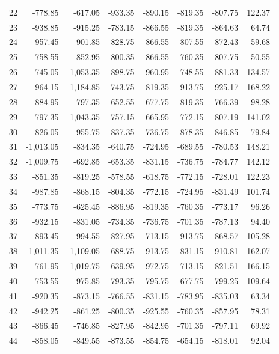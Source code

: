 \begin{longtable}{rrrrrrrr}
22 & -778.85 & -617.05 & -933.35 & -890.15 & -819.35 & -807.75 & 122.37  \\
23 & -938.85 & -915.25 & -783.15 & -866.55 & -819.35 & -864.63 & 64.74  \\
24 & -957.45 & -901.85 & -828.75 & -866.55 & -807.55 & -872.43 & 59.68  \\
25 & -758.55 & -852.95 & -800.35 & -866.55 & -760.35 & -807.75 & 50.55  \\
26 & -745.05 & -1,053.35 & -898.75 & -960.95 & -748.55 & -881.33 & 134.57  \\
27 & -964.15 & -1,184.85 & -743.75 & -819.35 & -913.75 & -925.17 & 168.22  \\
28 & -884.95 & -797.35 & -652.55 & -677.75 & -819.35 & -766.39 & 98.28  \\
29 & -797.35 & -1,043.35 & -757.15 & -665.95 & -772.15 & -807.19 & 141.02  \\
30 & -826.05 & -955.75 & -837.35 & -736.75 & -878.35 & -846.85 & 79.84  \\
31 & -1,013.05 & -834.35 & -640.75 & -724.95 & -689.55 & -780.53 & 148.21  \\
32 & -1,009.75 & -692.85 & -653.35 & -831.15 & -736.75 & -784.77 & 142.12  \\
33 & -851.35 & -819.25 & -578.55 & -618.75 & -772.15 & -728.01 & 122.23  \\
34 & -987.85 & -868.15 & -804.35 & -772.15 & -724.95 & -831.49 & 101.74  \\
35 & -773.75 & -625.45 & -886.95 & -819.35 & -760.35 & -773.17 & 96.26  \\
36 & -932.15 & -831.05 & -734.35 & -736.75 & -701.35 & -787.13 & 94.40  \\
37 & -893.45 & -994.55 & -827.95 & -713.15 & -913.75 & -868.57 & 105.28  \\
38 & -1,011.35 & -1,109.05 & -688.75 & -913.75 & -831.15 & -910.81 & 162.07  \\
39 & -761.95 & -1,019.75 & -639.95 & -972.75 & -713.15 & -821.51 & 166.15  \\
40 & -753.55 & -975.85 & -793.35 & -795.75 & -677.75 & -799.25 & 109.64  \\
41 & -920.35 & -873.15 & -766.55 & -831.15 & -783.95 & -835.03 & 63.34  \\
42 & -942.25 & -861.25 & -800.35 & -925.55 & -760.35 & -857.95 & 78.31  \\
43 & -866.45 & -746.85 & -827.95 & -842.95 & -701.35 & -797.11 & 69.92  \\
44 & -858.05 & -849.55 & -873.55 & -854.75 & -654.15 & -818.01 & 92.04  \\

\end{longtable}
